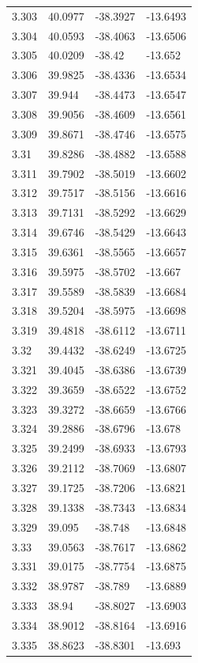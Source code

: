 \begin{tabular}{llll}
3.303 & 40.0977 & -38.3927 & -13.6493 \\
3.304 & 40.0593 & -38.4063 & -13.6506 \\
3.305 & 40.0209 & -38.42 & -13.652 \\
3.306 & 39.9825 & -38.4336 & -13.6534 \\
3.307 & 39.944 & -38.4473 & -13.6547 \\
3.308 & 39.9056 & -38.4609 & -13.6561 \\
3.309 & 39.8671 & -38.4746 & -13.6575 \\
3.31 & 39.8286 & -38.4882 & -13.6588 \\
3.311 & 39.7902 & -38.5019 & -13.6602 \\
3.312 & 39.7517 & -38.5156 & -13.6616 \\
3.313 & 39.7131 & -38.5292 & -13.6629 \\
3.314 & 39.6746 & -38.5429 & -13.6643 \\
3.315 & 39.6361 & -38.5565 & -13.6657 \\
3.316 & 39.5975 & -38.5702 & -13.667 \\
3.317 & 39.5589 & -38.5839 & -13.6684 \\
3.318 & 39.5204 & -38.5975 & -13.6698 \\
3.319 & 39.4818 & -38.6112 & -13.6711 \\
3.32 & 39.4432 & -38.6249 & -13.6725 \\
3.321 & 39.4045 & -38.6386 & -13.6739 \\
3.322 & 39.3659 & -38.6522 & -13.6752 \\
3.323 & 39.3272 & -38.6659 & -13.6766 \\
3.324 & 39.2886 & -38.6796 & -13.678 \\
3.325 & 39.2499 & -38.6933 & -13.6793 \\
3.326 & 39.2112 & -38.7069 & -13.6807 \\
3.327 & 39.1725 & -38.7206 & -13.6821 \\
3.328 & 39.1338 & -38.7343 & -13.6834 \\
3.329 & 39.095 & -38.748 & -13.6848 \\
3.33 & 39.0563 & -38.7617 & -13.6862 \\
3.331 & 39.0175 & -38.7754 & -13.6875 \\
3.332 & 38.9787 & -38.789 & -13.6889 \\
3.333 & 38.94 & -38.8027 & -13.6903 \\
3.334 & 38.9012 & -38.8164 & -13.6916 \\
3.335 & 38.8623 & -38.8301 & -13.693 \\

\end{tabular}
